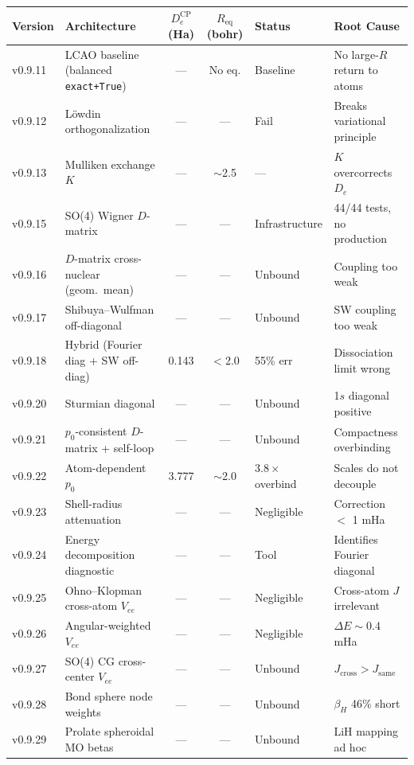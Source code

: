 \documentclass[aps,pra,twocolumn,superscriptaddress,longbibliography]{revtex4-2}
\begin{document}
\begin{table}[t]
\centering
\small
\begin{tabular}{llccll}
\toprule
Version & Architecture & $D_e^{\mathrm{CP}}$ (Ha) & $R_{\mathrm{eq}}$ (bohr)
& Status & Root Cause \\
\midrule
v0.9.11 & LCAO baseline (balanced \texttt{exact+True})
  & --- & No eq. & Baseline & No large-$R$ return to atoms \\
v0.9.12 & L\"owdin orthogonalization
  & --- & --- & Fail & Breaks variational principle \\
v0.9.13 & Mulliken exchange $K$
  & --- & $\sim$2.5 & --- & $K$ overcorrects $D_e$ \\
v0.9.15 & SO(4) Wigner $D$-matrix
  & --- & --- & Infrastructure & 44/44 tests, no production \\
v0.9.16 & $D$-matrix cross-nuclear (geom.\ mean)
  & --- & --- & Unbound & Coupling too weak \\
v0.9.17 & Shibuya--Wulfman off-diagonal
  & --- & --- & Unbound & SW coupling too weak \\
v0.9.18 & Hybrid (Fourier diag + SW off-diag)
  & 0.143 & $<$2.0 & 55\% err & Dissociation limit wrong \\
v0.9.20 & Sturmian diagonal
  & --- & --- & Unbound & 1$s$ diagonal positive \\
v0.9.21 & $p_0$-consistent $D$-matrix + self-loop
  & --- & --- & Unbound & Compactness overbinding \\
v0.9.22 & Atom-dependent $p_0$
  & 3.777 & $\sim$2.0 & $3.8\times$ overbind & Scales do not decouple \\
v0.9.23 & Shell-radius attenuation
  & --- & --- & Negligible & Correction $<$ 1 mHa \\
v0.9.24 & Energy decomposition diagnostic
  & --- & --- & Tool & Identifies Fourier diagonal \\
v0.9.25 & Ohno--Klopman cross-atom $V_{ee}$
  & --- & --- & Negligible & Cross-atom $J$ irrelevant \\
v0.9.26 & Angular-weighted $V_{ee}$
  & --- & --- & Negligible & $\Delta E \sim 0.4$ mHa \\
v0.9.27 & SO(4) CG cross-center $V_{ee}$
  & --- & --- & Unbound & $J_{\mathrm{cross}} > J_{\mathrm{same}}$ \\
v0.9.28 & Bond sphere node weights
  & --- & --- & Unbound & $\beta_H$ 46\% short \\
v0.9.29 & Prolate spheroidal MO betas
  & --- & --- & Unbound & LiH mapping ad hoc \\

\end{tabular}
\end{table}
\end{document}
